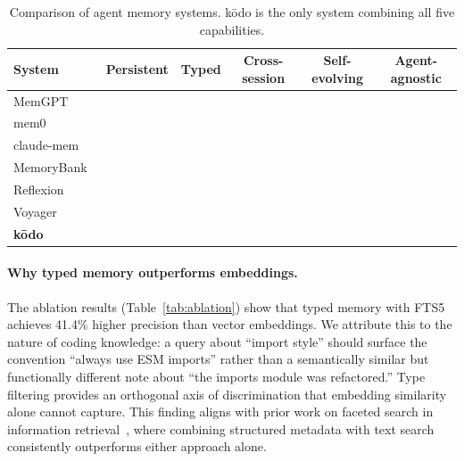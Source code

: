 \documentclass{article}
\newcommand{\cmark}{\ding{51}}
\newcommand{\xmark}{\ding{55}}
\begin{document}
\begin{table}[t]
\centering
\caption{Comparison of agent memory systems. k\=odo is the only system combining all five capabilities.}
\label{tab:comparison}
\begin{tabular}{lccccc}
\toprule
\textbf{System} & \textbf{Persistent} & \textbf{Typed} & \textbf{Cross-session} & \textbf{Self-evolving} & \textbf{Agent-agnostic} \\
\midrule
MemGPT~\cite{packer2023memgpt} & \xmark & \xmark & \xmark & \xmark & \xmark \\
mem0~\cite{mem0} & \cmark & \xmark & \xmark & \xmark & \cmark \\
claude-mem~\cite{claudemem} & \cmark & \xmark & \xmark & \xmark & \xmark \\
MemoryBank~\cite{zhong2024memorybank} & \cmark & \xmark & \xmark & \cmark & \xmark \\
Reflexion~\cite{shinn2023reflexion} & \xmark & \xmark & \xmark & \xmark & \cmark \\
Voyager~\cite{wang2024voyager} & \cmark & \cmark & \xmark & \xmark & \xmark \\
\textbf{k\=odo} & \cmark & \cmark & \cmark & \cmark & \cmark \\
\bottomrule
\end{tabular}
\end{table}

\paragraph{Why typed memory outperforms embeddings.} The ablation results (Table~\ref{tab:ablation}) show that typed memory with FTS5 achieves 41.4\% higher precision than vector embeddings. We attribute this to the nature of coding knowledge: a query about ``import style'' should surface the convention ``always use ESM imports'' rather than a semantically similar but functionally different note about ``the imports module was refactored.'' Type filtering provides an orthogonal axis of discrimination that embedding similarity alone cannot capture. This finding aligns with prior work on faceted search in information retrieval~\cite{gao2023retrieval}, where combining structured metadata with text search consistently outperforms either approach alone.
\end{document}
